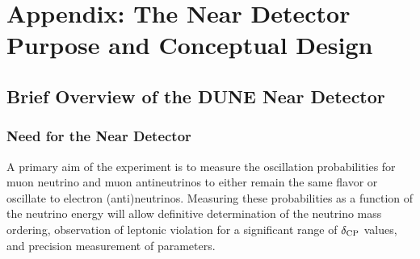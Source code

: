\chapter{Appendix: The Near Detector Purpose and Conceptual Design}
\label{ch:appx-nd}

\section{Brief Overview of the DUNE Near Detector}
\label{sec:appx-nd-overview}


\subsection{Need for the Near Detector}
\label{sec:appx-nd:BriefOverview-need}

A primary aim of the  experiment is to measure the oscillation probabilities for muon neutrino and muon antineutrinos to either remain the same flavor or oscillate to electron (anti)neutrinos. 
Measuring these probabilities as a function of the neutrino energy will allow definitive determination of the neutrino mass ordering, observation of leptonic  violation for a significant range of $\delta_{\rm{CP}}$ values, and precision measurement of  parameters.


